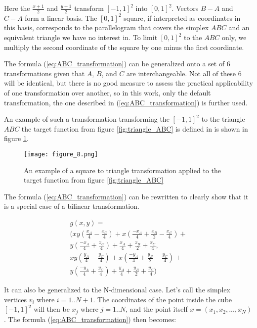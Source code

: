 \documentclass[
	a4paper, %
	10pt, %
	unnumberedsections, %
	twoside, %
]{LTJournalArticle}
\begin{document}
Here the $\frac{x+1}{2}$ and $\frac{y+1}{2}$ transform $[-1, 1]^2$ into $[0, 1]^2$. Vectors $B-A$ and $C-A$ form a linear basis. The $[0, 1]^2$ square, if interpreted as coordinates in this basis, corresponds to the parallelogram that covers the simplex $ABC$ and an equivalent triangle we have no interest in. To limit $[0, 1]^2$ to the $ABC$ only, we multiply the second coordinate of the square by one minus the first coordinate. 

The formula (\ref{eq:ABC_transformation}) can be generalized onto a set of 6 transformations given that $A$, $B$, and $C$ are interchangeable. Not all of these 6 will be identical, but there is no good measure to assess the practical applicability of one transformation over another, so in this work, only the default transformation, the one described in (\ref{eq:ABC_transformation}) is further used.

An example of such a transformation transforming the $[-1, 1]^2$ to the triangle $ABC$ the target function from figure \ref{fig:triangle_ABC} is defined in is shown in figure \ref{fig:square_to_triangle_transformation}.

\begin{figure} 
	\texttt{[image: figure\_8.png]}
	\caption{An example of a square to triangle transformation applied to the target function from figure \ref{fig:triangle_ABC}}
	\label{fig:square_to_triangle_transformation}
\end{figure}

The formula (\ref{eq:ABC_transformation}) can be rewritten to clearly show that it is a special case of a bilinear transformation.

\begin{equation}
	\begin{split}
g(x, y) = \\	
(xy(\frac{x_A}{4}  - \frac{x_C}{4}) + x(\frac{-x_A}{4} + \frac{x_B}{2} - \frac{x_C}{4}) + \\
 y(\frac{-x_A}{4} + \frac{x_C}{4})  + \frac{x_A}{4} + \frac{x_B}{2} + \frac{x_C}{4}, \\
xy(\frac{y_A}{4}  - \frac{y_C}{4}) + x(\frac{-y_A}{4} + \frac{y_B}{2} - \frac{y_C}{4}) + \\
y(\frac{-y_A}{4} + \frac{y_C}{4})  + \frac{y_A}{4} + \frac{y_B}{2} + \frac{y_C}{4})
	\end{split}
	\label{eq:ABC_simpler_transformation}
\end{equation}

It can also be generalized to the N-dimensional case. Let's call the simplex vertices $v_i$ where $i = 1..N+1$. The coordinates of the point inside the cube $[-1, 1]^2$ will then be $x_j$ where $j = 1..N$, and the point itself $x = (x_1, x_2, ..., x_N)$. The formula (\ref{eq:ABC_transformation}) then becomes:
\end{document}
